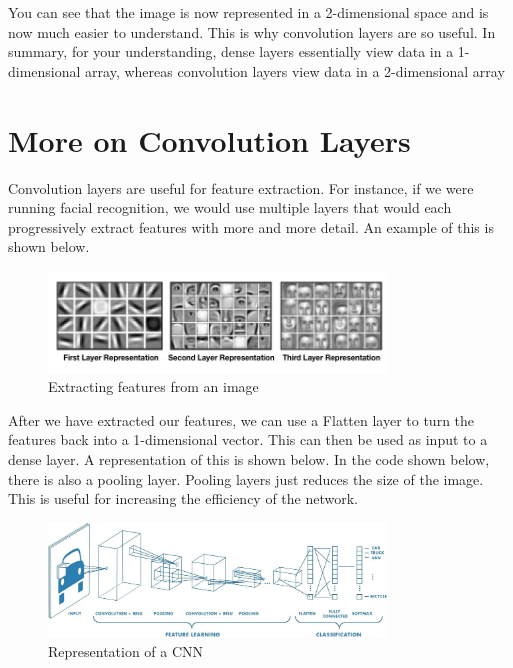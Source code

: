 \documentclass[11pt]{report}
\begin{document}
\pagebreak

You can see that the image is now represented in a 2-dimensional space and is now much easier to understand. This is why convolution layers are so useful.
In summary, for your understanding, dense layers essentially view data in a 1-dimensional array, whereas convolution layers view data in a 2-dimensional array

\section{More on Convolution Layers}
Convolution layers are useful for feature extraction. For instance, if we were running facial recognition, we would use multiple layers that would each progressively extract features with more and more detail. An example of this is shown below.

\begin{figure}[h]
\centering
\includegraphics[width=0.8\textwidth]{featureextraction.jpg}
\caption{Extracting features from an image}
\label{fig:conv1}
\end{figure}

After we have extracted our features, we can use a Flatten layer to turn the features back into a 1-dimensional vector. This can then be used as input to a dense layer. A representation of this is shown below. In the code shown below, there is also a pooling layer. Pooling layers just reduces the size of the image. This is useful for increasing the efficiency of the network.

\begin{figure}[h]
\centering
\includegraphics[width=0.8\textwidth]{convexamp.jpeg}
\caption{Representation of a CNN}
\label{fig:cnn}
\end{figure}
\end{document}
